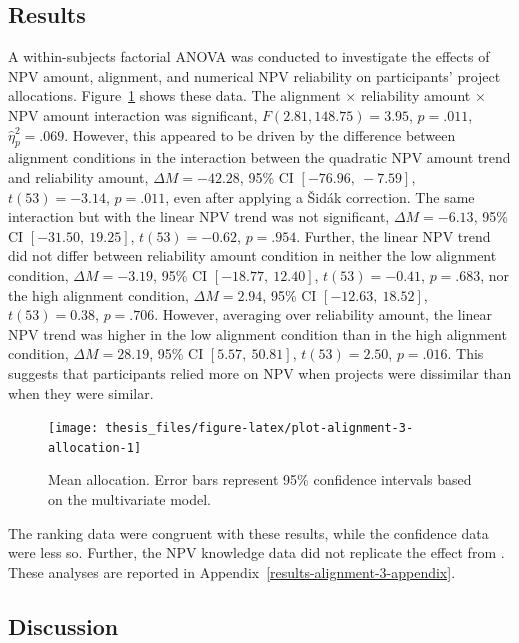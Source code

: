 \documentclass[a4paper, nobind, dvipsnames]{templates/ociamthesis}
\theoremstyle{definition}
\theoremstyle{definition}
\theoremstyle{definition}
\theoremstyle{definition}
\theoremstyle{remark}
\begin{document}
\subsection{Results}

A within-subjects factorial ANOVA was conducted to investigate the effects of
NPV amount, alignment, and numerical NPV reliability on participants' project
allocations. Figure~\ref{fig:plot-alignment-3-allocation} shows these data. The
alignment \(\times\) reliability amount \(\times\) NPV amount interaction was
significant,
\(F(2.81, 148.75) = 3.95\), \(p = .011\), \(\hat{\eta}^2_p = .069\).
However, this appeared to be driven by the difference between alignment
conditions in the interaction between the quadratic NPV amount trend and
reliability amount,
\(\Delta M = -42.28\), 95\% CI \([-76.96,~-7.59]\), \(t(53) = -3.14\), \(p = .011\), even after
applying a Šidák correction. The same interaction but with the linear NPV trend
was not significant,
\(\Delta M = -6.13\), 95\% CI \([-31.50,~19.25]\), \(t(53) = -0.62\), \(p = .954\). Further, the linear
NPV trend did not differ between reliability amount condition in neither the low
alignment condition, \(\Delta M = -3.19\), 95\% CI \([-18.77,~12.40]\), \(t(53) = -0.41\), \(p = .683\), nor
the high alignment condition,
\(\Delta M = 2.94\), 95\% CI \([-12.63,~18.52]\), \(t(53) = 0.38\), \(p = .706\). However, averaging over
reliability amount, the linear NPV trend was higher in the low alignment
condition than in the high alignment condition,
\(\Delta M = 28.19\), 95\% CI \([5.57,~50.81]\), \(t(53) = 2.50\), \(p = .016\). This suggests that
participants relied more on NPV when projects were dissimilar than when they
were similar.



\begin{figure}
\texttt{[image: thesis\_files/figure-latex/plot-alignment-3-allocation-1]} \caption{Mean allocation. Error bars represent 95\% confidence intervals based on the multivariate model.}\label{fig:plot-alignment-3-allocation}
\end{figure}

The ranking data were congruent with these results, while the confidence data
were less so. Further, the NPV knowledge data did not replicate the effect from
\textcite[Study 1]{long2018}. These analyses are reported in
Appendix~\ref{results-alignment-3-appendix}.

\subsection{Discussion}
\end{document}
